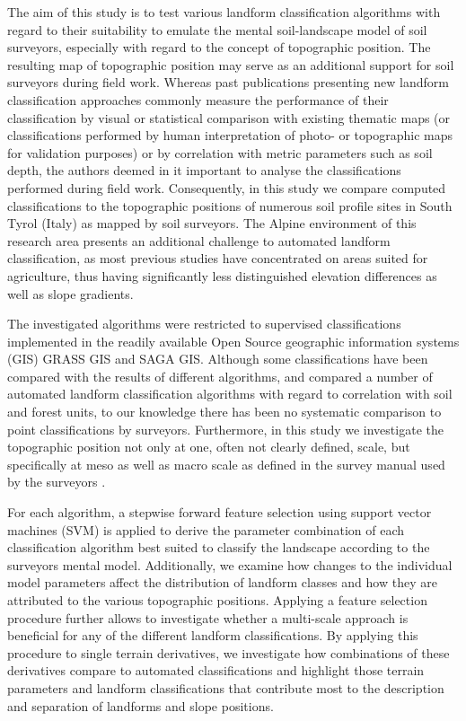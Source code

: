\documentclass[preprint,12pt,authoryear]{elsarticle}
\begin{document}
The aim of this study is to test various landform classification algorithms with regard to their suitability to emulate the mental soil-landscape model of soil surveyors, especially with regard to the concept of topographic position. The resulting map of topographic position may serve as an additional support for soil surveyors during field work. Whereas past publications presenting new landform classification approaches commonly measure the performance of their classification by visual or statistical comparison with existing thematic maps (or classifications performed by human interpretation of photo- or topographic maps for validation purposes) or by correlation with metric parameters such as soil depth, the authors deemed in it important to analyse the classifications performed during field work. Consequently, in this study we compare computed classifications to the topographic positions of numerous soil profile sites in South Tyrol (Italy) as mapped by soil surveyors. The Alpine environment of this research area presents an additional challenge to automated landform classification, as most previous studies have concentrated on areas suited for agriculture, thus having significantly less distinguished elevation differences as well as slope gradients.

The investigated algorithms were restricted to supervised classifications implemented in the readily available Open Source geographic information systems (GIS) GRASS GIS \citep{GRASS_GIS_software} and SAGA GIS\citep{conrad2015system}.  Although some classifications have been compared with the results of different algorithms, and \cite{Barka2011} compared a number of automated landform classification algorithms with regard to correlation with soil and forest units, to our knowledge there has been no systematic comparison to point classifications by surveyors. Furthermore, in this study we investigate the topographic position not only at one, often not clearly defined, scale, but specifically at meso as well as macro scale as defined in the survey manual used by the surveyors \citep{Englisch1998}.

 For each algorithm, a stepwise forward feature selection using support vector machines (SVM) is applied to derive the parameter combination of each classification algorithm best suited to classify the landscape according to the surveyors mental model. Additionally, we examine how changes to the individual model parameters affect the distribution of landform classes and how they are attributed to the various topographic positions. Applying a feature selection procedure further allows to investigate whether a multi-scale approach is beneficial for any of the different landform classifications. By applying this procedure to single terrain derivatives, we investigate how combinations of these derivatives compare to automated classifications and highlight those terrain parameters and landform classifications that contribute most to the description and separation of landforms and slope positions.
\end{document}
